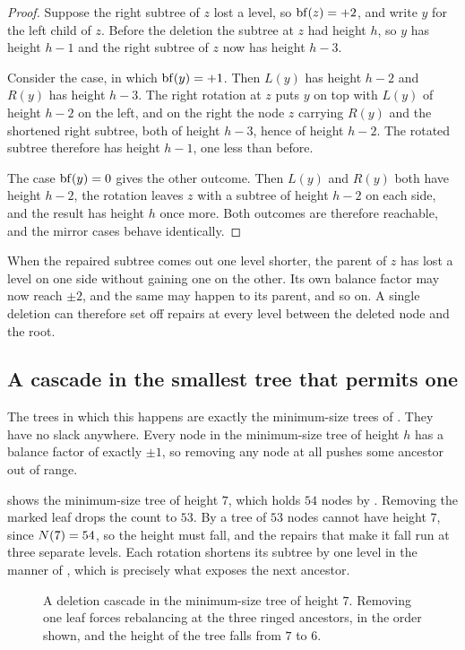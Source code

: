 \begin{proof}
Suppose the right subtree of $z$ lost a level, so $\operatorname{bf}(z) = +2$, and write $y$
for the left child of $z$. Before the deletion the subtree at $z$ had height $h$,
so $y$ has height $h-1$ and the right subtree of $z$ now has height $h-3$.

Consider the  case, in which $\operatorname{bf}(y) = +1$. Then $L(y)$ has height
$h-2$ and $R(y)$ has height $h-3$. The right rotation at $z$ puts $y$ on top with
$L(y)$ of height $h-2$ on the left, and on the right the node $z$ carrying $R(y)$
and the shortened right subtree, both of height $h-3$, hence of height $h-2$. The
rotated subtree therefore has height $h-1$, one less than before.

The case $\operatorname{bf}(y) = 0$ gives the other outcome. Then $L(y)$ and $R(y)$ both have
height $h-2$, the rotation leaves $z$ with a subtree of height $h-2$ on each
side, and the result has height $h$ once more. Both outcomes are therefore
reachable, and the mirror cases behave identically.
\end{proof}

When the repaired subtree comes out one level shorter, the parent of $z$ has lost
a level on one side without gaining one on the other. Its own balance factor may
now reach $\pm 2$, and the same may happen to its parent, and so on. A single
deletion can therefore set off repairs at every level between the deleted node
and the root.

\subsection{A cascade in the smallest tree that permits one}

The trees in which this happens are exactly the minimum-size trees of
. They have no slack anywhere. Every node in the minimum-size
tree of height $h$ has a balance factor of exactly $\pm 1$, so removing any node
at all pushes some ancestor out of range.

 shows the minimum-size tree of height $7$, which holds $54$
nodes by . Removing the marked leaf drops the count to $53$. By
 a tree of $53$ nodes cannot have height $7$, since $N(7) = 54$,
so the height must fall, and the repairs that make it fall run at three separate
levels. Each rotation shortens its subtree by one level in the manner of
, which is precisely what exposes the next ancestor.

\begin{figure}[t]
  \centering
  
  \caption{A deletion cascade in the minimum-size tree of height $7$. Removing
  one leaf forces rebalancing at the three ringed ancestors, in the order shown,
  and the height of the tree falls from $7$ to $6$.}
  \label{fig:cascade}
\end{figure}

